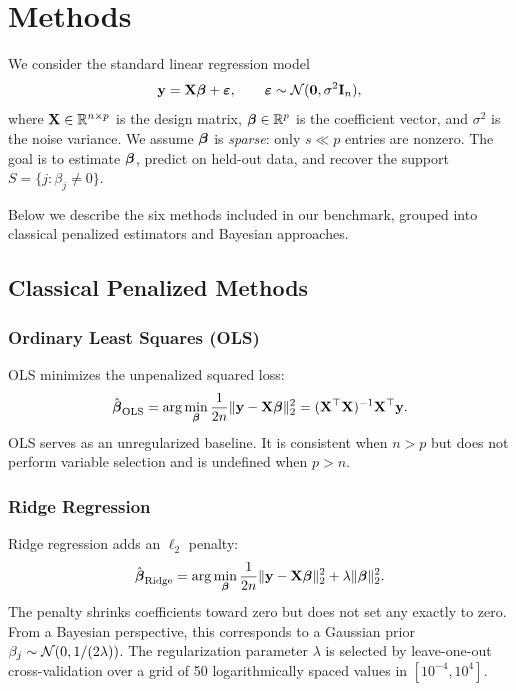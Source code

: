 \section{Methods}
\label{sec:methods}

We consider the standard linear regression model
\begin{equation}
\label{eq:linear_model}
\mathbf{y} = \mathbf{X} \boldsymbol{\beta} + \boldsymbol{\varepsilon}, \qquad \boldsymbol{\varepsilon} \sim \mathcal{N}(\mathbf{0}, \sigma^2 \mathbf{I}_n),
\end{equation}
where $\mathbf{X} \in \mathbb{R}^{n \times p}$ is the design matrix, $\boldsymbol{\beta} \in \mathbb{R}^p$ is the coefficient vector, and $\sigma^2$ is the noise variance.
We assume $\boldsymbol{\beta}$ is \emph{sparse}: only $s \ll p$ entries are nonzero.
The goal is to estimate $\boldsymbol{\beta}$, predict on held-out data, and recover the support $S = \{j : \beta_j \neq 0\}$.

Below we describe the six methods included in our benchmark, grouped into classical penalized estimators and Bayesian approaches.

\subsection{Classical Penalized Methods}

\subsubsection{Ordinary Least Squares (OLS)}

OLS minimizes the unpenalized squared loss:
\begin{equation}
\hat{\boldsymbol{\beta}}_{\text{OLS}} = \arg\min_{\boldsymbol{\beta}} \frac{1}{2n} \|\mathbf{y} - \mathbf{X} \boldsymbol{\beta}\|_2^2 = (\mathbf{X}^\top \mathbf{X})^{-1} \mathbf{X}^\top \mathbf{y}.
\end{equation}
OLS serves as an unregularized baseline.
It is consistent when $n > p$ but does not perform variable selection and is undefined when $p > n$.

\subsubsection{Ridge Regression}

Ridge regression \citep{hoerl1970ridge} adds an $\ell_2$ penalty:
\begin{equation}
\hat{\boldsymbol{\beta}}_{\text{Ridge}} = \arg\min_{\boldsymbol{\beta}} \frac{1}{2n} \|\mathbf{y} - \mathbf{X} \boldsymbol{\beta}\|_2^2 + \lambda \|\boldsymbol{\beta}\|_2^2.
\end{equation}
The penalty shrinks coefficients toward zero but does not set any exactly to zero.
From a Bayesian perspective, this corresponds to a Gaussian prior $\beta_j \sim \mathcal{N}(0, 1/(2\lambda))$.
The regularization parameter $\lambda$ is selected by leave-one-out cross-validation over a grid of 50 logarithmically spaced values in $[10^{-4}, 10^{4}]$.

